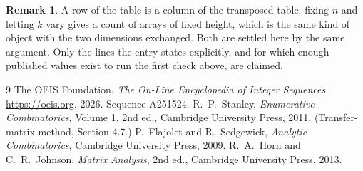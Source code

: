 \documentclass[11pt,a4paper]{article}
\theoremstyle{plain}
\theoremstyle{definition}
\newtheorem{remark}[theorem]{Remark}
\begin{document}
\begin{remark}
A row of the table is a column of the transposed table: fixing $n$ and letting $k$ vary gives a
count of arrays of fixed height, which is the same kind of object with the two dimensions
exchanged. Both are settled here by the same argument. Only the lines the entry states
explicitly, and for which enough published values exist to run the first check above, are
claimed.
\end{remark}

\begin{thebibliography}{9}
 The OEIS Foundation, \emph{The On-Line Encyclopedia of Integer
Sequences}, \url{https://oeis.org}, 2026. Sequence A251524.
 R.~P.~Stanley, \emph{Enumerative Combinatorics}, Volume 1, 2nd ed.,
Cambridge University Press, 2011. (Transfer-matrix method, Section 4.7.)
 P.~Flajolet and R.~Sedgewick, \emph{Analytic Combinatorics}, Cambridge
University Press, 2009.
 R.~A.~Horn and C.~R.~Johnson, \emph{Matrix Analysis}, 2nd ed., Cambridge
University Press, 2013.
\end{thebibliography}
\end{document}
